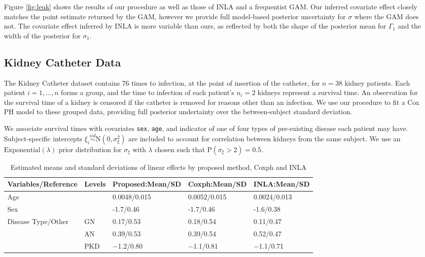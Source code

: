 \documentclass[AMA,STIX1COL,doublespace]{WileyNJD-v2}
\begin{document}
Figure \ref{fig:leuk} shows the results of our procedure as well as those of INLA and a frequentist GAM. Our inferred covariate effect closely matches the point estimate returned by the GAM, however we provide full model-based posterior uncertainty for $\sigma$ where the GAM does not. The covariate effect inferred by INLA is more variable than ours, as reflected by both the shape of the posterior mean for $\Gamma_{1}$ and the width of the posterior for $\sigma_{1}$.

\subsection{Kidney Catheter Data}

The Kidney Catheter dataset contains 76 times to infection, at the point of insertion of the catheter, for $n = 38$  kidney patients. Each patient $i=1,\ldots,n$ forms a group, and the time to infection of each patient's $n_{i} = 2$ kidneys represent a survival time. An observation for the survival time of a kidney is censored if the catheter is removed for reasons other than an infection. We use our procedure to fit a Cox PH model to these grouped data, providing full posterior undertainty over the between-subject standard deviation.

We associate survival times with covariates \texttt{sex}, \texttt{age}, and indicator of one of four types of pre-existing disease each patient may have. Subject-specific intercepts $\xi_{i}\overset{iid}{\sim}\text{N}(0,\sigma^{2}_{\xi})$ are included to account for correlation between kidneys from the same subject. We use an $\text{Exponential}(\lambda)$ prior distribution for $\sigma_{\xi}$ with $\lambda$ chosen such that $\text{P}(\sigma_{\xi} > 2) = 0.5$.

\begin{table}[ht]
\centering
\begin{tabular}{ |p{3cm} p{3cm}|p{3cm} p{3cm} p{3cm}|}
 \hline
 Variables/Reference & Levels & Proposed:Mean/SD & Coxph:Mean/SD &INLA:Mean/SD \\
 \hline
 Age & & 0.0048/0.015 & 0.0052/0.015 & 0.0024/0.013\\
 Sex & & -1.7/0.46  & -1.7/0.46 &  -1.6/0.38\\
 Disease Type/Other & GN & 0.17/0.53 &  0.18/0.54 & 0.11/0.47\\
  & AN & 0.39/0.53 & 0.39/0.54 & 0.52/0.47\\
  & PKD & −1.2/0.80  & −1.1/0.81 & −1.1/0.71\\
\hline
\end{tabular}
\caption{Estimated means and standard deviations of linear effects by proposed method, Coxph and INLA}
\label{table:KidneyFixed}
\end{table}
\end{document}
